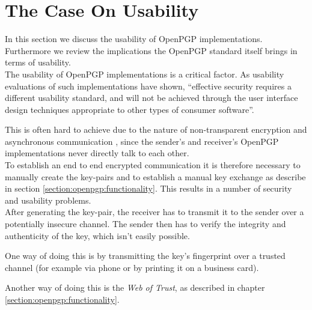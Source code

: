 

\section{The Case On Usability} \label{section:concerns:usability}

In this section we discuss the usability of OpenPGP implementations. Furthermore we review the implications the OpenPGP standard itself brings in terms of usability. \\


The usability of OpenPGP implementations is a critical factor. As usability evaluations of such implementations \cite{Whitten1999} have shown, ``effective security requires a different usability standard, and will not be achieved through the user interface design techniques appropriate to other types of consumer software''.

This is often hard to achieve due to the nature of non-transparent encryption and asynchronous communication \citep[section 2.1]{RFC4880}, since the sender's and receiver's OpenPGP implementations never directly talk to each other. \\

To establish an end to end encrypted communication it is therefore necessary to manually create the key-pairs and to establish a manual key exchange as describe in section \ref{section:openpgp:functionality}. This results in a number of security and usability problems.  \\


After generating the key-pair, the receiver has to transmit it to the sender over a potentially insecure channel. The sender then has to verify the integrity and authenticity of the key, which isn't easily possible.

One way of doing this is by transmitting the key's fingerprint over a trusted channel (for example via phone or by printing it on a business card). 

Another way of doing this is the \textit{Web of Trust}, as described in chapter \ref{section:openpgp:functionality}. \\


